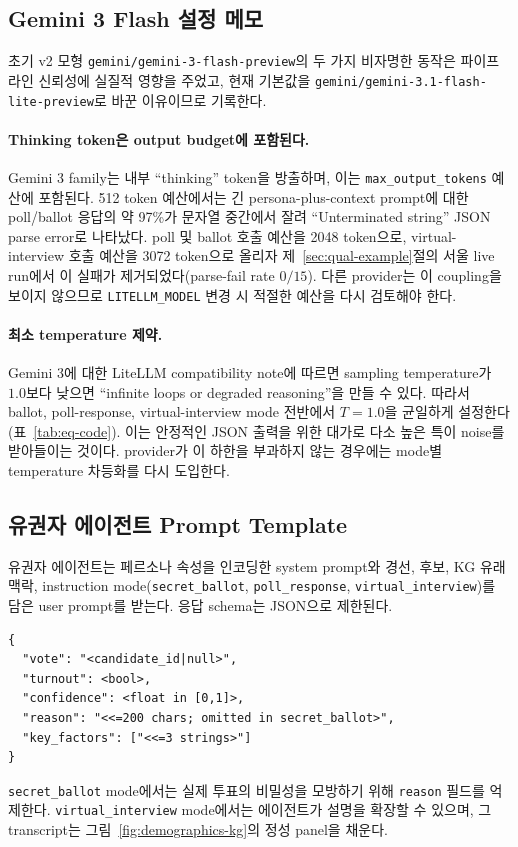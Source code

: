 \documentclass[11pt]{article}
\begin{document}
\subsection{Gemini 3 Flash 설정 메모}
\label{app:gemini3-config}

초기 v2 모형 \texttt{gemini/gemini-3-flash-preview}의 두 가지 비자명한 동작은 파이프라인 신뢰성에 실질적 영향을 주었고, 현재 기본값을 \texttt{gemini/gemini-3.1-flash-lite-preview}로 바꾼 이유이므로 기록한다.

\paragraph{Thinking token은 output budget에 포함된다.}
Gemini 3 family는 내부 ``thinking'' token을 방출하며, 이는 \texttt{max\_output\_tokens} 예산에 포함된다. 512 token 예산에서는 긴 persona-plus-context prompt에 대한 poll/ballot 응답의 약 97\%가 문자열 중간에서 잘려 ``Unterminated string'' JSON parse error로 나타났다. poll 및 ballot 호출 예산을 2048 token으로, virtual-interview 호출 예산을 3072 token으로 올리자 제~\ref{sec:qual-example}절의 서울 live run에서 이 실패가 제거되었다(parse-fail rate $0/15$). 다른 provider는 이 coupling을 보이지 않으므로 \texttt{LITELLM\_MODEL} 변경 시 적절한 예산을 다시 검토해야 한다.

\paragraph{최소 temperature 제약.}
Gemini 3에 대한 LiteLLM compatibility note에 따르면 sampling temperature가 $1.0$보다 낮으면 ``infinite loops or degraded reasoning''을 만들 수 있다. 따라서 ballot, poll-response, virtual-interview mode 전반에서 $T = 1.0$을 균일하게 설정한다(표~\ref{tab:eq-code}). 이는 안정적인 JSON 출력을 위한 대가로 다소 높은 특이 noise를 받아들이는 것이다. provider가 이 하한을 부과하지 않는 경우에는 mode별 temperature 차등화를 다시 도입한다.

\subsection{유권자 에이전트 Prompt Template}

유권자 에이전트는 페르소나 속성을 인코딩한 system prompt와 경선, 후보, KG 유래 맥락, instruction mode(\texttt{secret\_ballot}, \texttt{poll\_response}, \texttt{virtual\_interview})를 담은 user prompt를 받는다. 응답 schema는 JSON으로 제한된다.
\begin{verbatim}
{
  "vote": "<candidate_id|null>",
  "turnout": <bool>,
  "confidence": <float in [0,1]>,
  "reason": "<<=200 chars; omitted in secret_ballot>",
  "key_factors": ["<<=3 strings>"]
}
\end{verbatim}
\texttt{secret\_ballot} mode에서는 실제 투표의 비밀성을 모방하기 위해 \texttt{reason} 필드를 억제한다. \texttt{virtual\_interview} mode에서는 에이전트가 설명을 확장할 수 있으며, 그 transcript는 그림~\ref{fig:demographics-kg}의 정성 panel을 채운다.
\end{document}
